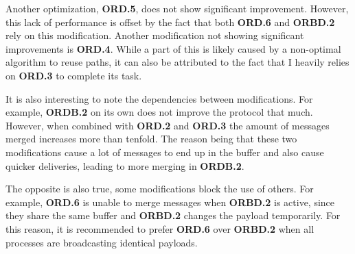 Another optimization, \textbf{ORD.5}, does not show significant improvement. However, this lack of performance is offset by the fact that both \textbf{ORD.6} and \textbf{ORBD.2} rely on this modification. Another modification not showing significant improvements is \textbf{ORD.4}. While a part of this is likely caused by a non-optimal algorithm to reuse paths, it can also be attributed to the fact that I heavily relies on \textbf{ORD.3} to complete its task.

It is also interesting to note the dependencies between modifications. For example, \textbf{ORDB.2} on its own does not improve the protocol that much. However, when combined with \textbf{ORD.2} and \textbf{ORD.3} the amount of messages merged increases more than tenfold. The reason being that these two modifications cause a lot of messages to end up in the buffer and also cause quicker deliveries, leading to more merging in \textbf{ORDB.2}.

The opposite is also true, some modifications block the use of others. For example, \textbf{ORD.6} is unable to merge messages when \textbf{ORBD.2} is active, since they share the same buffer and \textbf{ORBD.2} changes the payload temporarily. For this reason, it is recommended to prefer \textbf{ORD.6} over \textbf{ORBD.2} when all processes are broadcasting identical payloads. 

